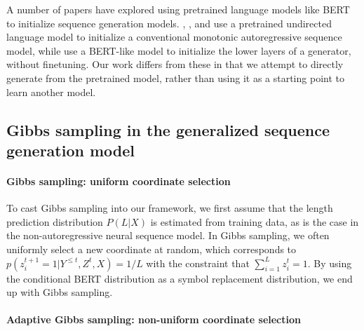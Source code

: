 \documentclass{article}
\begin{document}
A number of papers have explored using pretrained language models like BERT to initialize sequence generation models.
\citet{Ramachandran_2017}, \citet{song2019mass}, and \citet{lample2019cross} use a pretrained undirected language model to initialize a conventional monotonic autoregressive sequence model, while  
\citet{edunov2019pretrained} use a BERT-like model to initialize the lower layers of a generator, without finetuning.
Our work differs from these in that we attempt to directly generate from the pretrained model, rather than using it as a starting point to learn another model. 

\subsection{Gibbs sampling in the generalized sequence generation model}
\label{subsec:gibbs_sampling}

\paragraph{Gibbs sampling: uniform coordinate selection}

To cast Gibbs sampling into our framework,
we first assume that the length prediction distribution $P(L|X)$ is estimated from training data, as is the case in the non-autoregressive neural sequence model.
In Gibbs sampling, we often uniformly select a new coordinate at random, which corresponds to 
    \mbox{$p(z_i^{t+1} = 1 | Y^{\leq t}, Z^{t}, X) = 1/L$}
with the constraint that $\sum_{i=1}^L z_i^t = 1$. By using the conditional BERT distribution as a symbol replacement distribution, we end up with Gibbs sampling.

\paragraph{Adaptive Gibbs sampling: non-uniform coordinate selection}\label{par:heuristic}
\end{document}
